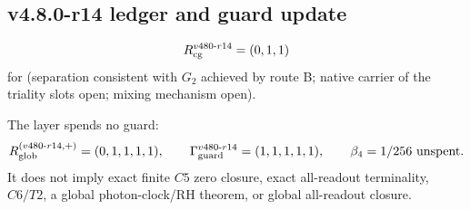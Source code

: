 \subsection*{v4.8.0-r14 ledger and guard update}
\label{subsec:v480-r14-ledger-guard}

\[
R_{\rm cg}^{v480\text{-}r14}=(0,1,1)
\]
for (separation consistent with \(G_2\) achieved by route B; native carrier of the triality slots open; mixing
mechanism open).

The layer spends no guard:
\[
R_{\rm glob}^{(v480\text{-}r14,+)}=(0,1,1,1,1),
\qquad
\Gamma_{\rm guard}^{v480\text{-}r14}=(1,1,1,1,1),
\qquad
\beta_4=1/256\ \text{unspent}.
\]
It does not imply exact finite \(C5\) zero closure, exact all-readout terminality,
\(C6/T2\), a global photon-clock/RH theorem, or global all-readout closure.
